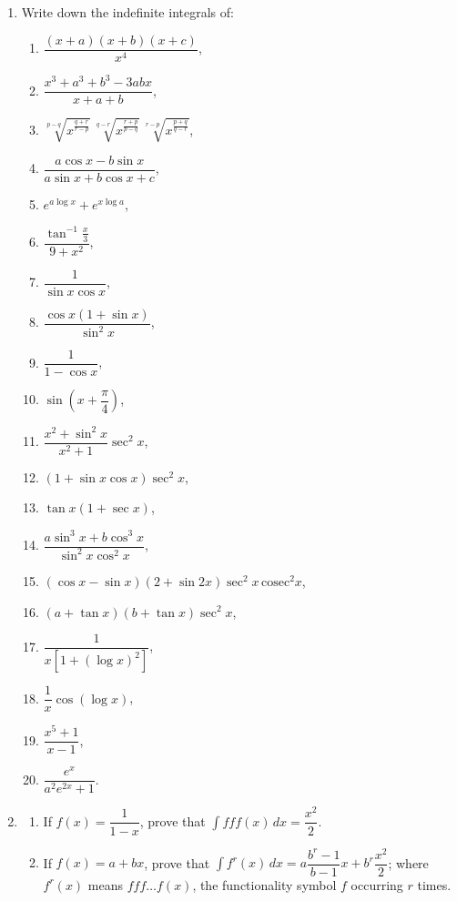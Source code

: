 \documentclass[11pt, a4paper]{article}
\begin{document}
\begin{enumerate}[leftmargin=2em]

\item Write down the indefinite integrals of:
\begin{enumerate}[label=(\arabic*)]
\item $\dfrac{(x+a)(x+b)(x+c)}{x^4}$,
\item $\dfrac{x^3+a^3+b^3-3abx}{x+a+b}$,
\item $\sqrt[p-q]{x^{\frac{q+r}{r-p}}}\, \sqrt[q-r]{x^{\frac{r+p}{p-q}}}\, \sqrt[r-p]{x^{\frac{p+q}{q-r}}}$,
\item $\dfrac{a\cos x - b\sin x}{a\sin x+b\cos x+c}$,
\item $e^{a\log x}+e^{x\log a}$,
\item $\dfrac{\tan^{-1}\frac{x}{3}}{9+x^2}$,
\item $\dfrac{1}{\sin x\cos x}$,
\item $\dfrac{\cos x(1+\sin x)}{\sin^2 x}$,
\item $\dfrac{1}{1-\cos x}$,
\item $\sin\left(x+\dfrac{\pi}{4}\right)$,
\item $\dfrac{x^2+\sin^2 x}{x^2+1}\sec^2 x$,
\item $(1+\sin x\cos x)\sec^2 x$,
\item $\tan x(1+\sec x)$,
\item $\dfrac{a\sin^3 x+b\cos^3 x}{\sin^2 x\cos^2 x}$,
\item $(\cos x-\sin x)(2+\sin 2x)\sec^2 x\,\text{cosec}^2 x$,
\item $(a+\tan x)(b+\tan x)\sec^2 x$,
\item $\dfrac{1}{x[1+(\log x)^2]}$,
\item $\dfrac{1}{x}\cos(\log x)$,
\item $\dfrac{x^5+1}{x-1}$,
\item $\dfrac{e^x}{a^2 e^{2x}+1}$.
\end{enumerate}

\item
\begin{enumerate}[label=(\alph*)]
\item If $f(x)=\dfrac{1}{1-x}$, prove that $\displaystyle\int fff(x)\, dx = \dfrac{x^2}{2}$.
\item If $f(x)=a+bx$, prove that $\displaystyle\int f^r(x)\, dx = a\dfrac{b^r-1}{b-1}x+b^r\dfrac{x^2}{2}$; where $f^r(x)$ means $fff\dots f(x)$, the functionality symbol $f$ occurring $r$ times.
\end{enumerate}


\end{enumerate}
\end{document}
